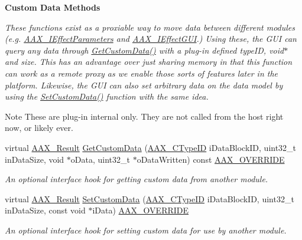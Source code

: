 \begin{Indent}{\bf Custom Data Methods}\par
{\em These functions exist as a proxiable way to move data between different modules (e.\+g. \hyperlink{a00099}{A\+A\+X\+\_\+\+I\+Effect\+Parameters} and \hyperlink{a00098}{A\+A\+X\+\_\+\+I\+Effect\+G\+U\+I}.) Using these, the G\+U\+I can query any data through \hyperlink{a00018_a6ee0e83b601dd8a7bec2c94139965a06}{Get\+Custom\+Data()} with a plug-\/in defined {\ttfamily type\+I\+D}, {\ttfamily void$\ast$} and size. This has an advantage over just sharing memory in that this function can work as a remote proxy as we enable those sorts of features later in the platform. Likewise, the G\+U\+I can also set arbitrary data on the data model by using the \hyperlink{a00018_a4fed39f4a0e6527808b7355bb34b1710}{Set\+Custom\+Data()} function with the same idea.

\begin{DoxyNote}{Note}
These are plug-\/in internal only. They are not called from the host right now, or likely ever. 
\end{DoxyNote}
}\begin{DoxyCompactItemize}
\item 
virtual \hyperlink{a00149_a4d8f69a697df7f70c3a8e9b8ee130d2f}{A\+A\+X\+\_\+\+Result} \hyperlink{a00018_a6ee0e83b601dd8a7bec2c94139965a06}{Get\+Custom\+Data} (\hyperlink{a00149_ac678f9c1fbcc26315d209f71a147a175}{A\+A\+X\+\_\+\+C\+Type\+I\+D} i\+Data\+Block\+I\+D, uint32\+\_\+t in\+Data\+Size, void $\ast$o\+Data, uint32\+\_\+t $\ast$o\+Data\+Written) const \hyperlink{a00149_ac2f24a5172689ae684344abdcce55463}{A\+A\+X\+\_\+\+O\+V\+E\+R\+R\+I\+D\+E}
\begin{DoxyCompactList}\small\item\em An optional interface hook for getting custom data from another module. \end{DoxyCompactList}\item 
virtual \hyperlink{a00149_a4d8f69a697df7f70c3a8e9b8ee130d2f}{A\+A\+X\+\_\+\+Result} \hyperlink{a00018_a4fed39f4a0e6527808b7355bb34b1710}{Set\+Custom\+Data} (\hyperlink{a00149_ac678f9c1fbcc26315d209f71a147a175}{A\+A\+X\+\_\+\+C\+Type\+I\+D} i\+Data\+Block\+I\+D, uint32\+\_\+t in\+Data\+Size, const void $\ast$i\+Data) \hyperlink{a00149_ac2f24a5172689ae684344abdcce55463}{A\+A\+X\+\_\+\+O\+V\+E\+R\+R\+I\+D\+E}
\begin{DoxyCompactList}\small\item\em An optional interface hook for setting custom data for use by another module. \end{DoxyCompactList}\end{DoxyCompactItemize}
\end{Indent}
